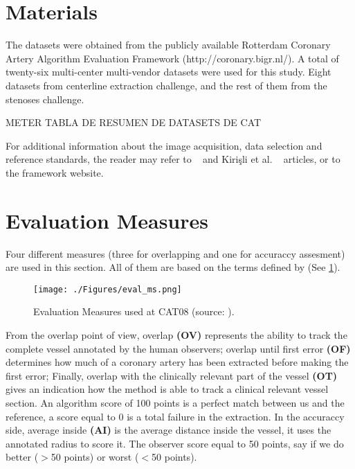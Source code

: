 \section{Materials}
 
The datasets were obtained from the publicly available Rotterdam Coronary Artery Algorithm Evaluation Framework (http://coronary.bigr.nl/). A total of twenty-six multi-center multi-vendor datasets were used for this study. Eight datasets from centerline extraction challenge, and the rest of them from the stenoses challenge. 

METER TABLA DE RESUMEN DE DATASETS DE CAT

For additional information about the image acquisition, data selection and reference standards, the reader may refer to ~\citep{Schaap2009} and Kirişli et al. ~\citep{Kirisli2013} articles, or to the framework website.

\section{Evaluation Measures}

Four different measures (three for overlapping and one for accuraccy assesment) are used in this section. All of them are based on the terms defined by \citep{Schaap2009} (See \ref{fig:exp3_ms}).

\begin{figure}[htbp]
	\centering
		\texttt{[image: ./Figures/eval\_ms.png]}
	\caption[Coronary Centerline Evaluation Measures CAT08]{Evaluation Measures used at CAT08 (source: \citep{Schaap2009}).}
	\label{fig:exp3_ms}
\end{figure}

From the overlap point of view, overlap \textbf{(OV)} represents the ability to track the complete vessel annotated by the human observers; overlap until first error \textbf{(OF)} determines how much of a coronary artery has been extracted before making the first error; Finally, overlap with the clinically relevant part of the vessel \textbf{(OT)} gives an indication how the method is able to track a clinical relevant vessel section. An algorithm score of 100 points is a perfect match between us and the reference, a score equal to 0 is a total failure in the extraction. In the accuraccy side, average inside \textbf{(AI)} is the average distance inside the vessel, it uses the annotated radius to score it. The observer score equal to 50 points, say if we do better ($>$50 points) or worst ($<$50 points).

